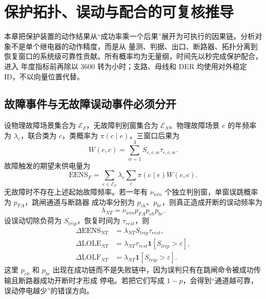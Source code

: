 \section{保护拓扑、误动与配合的可复核推导}\label{sec:rel-protection-topology-cases}

本章把保护装置的动作结果从“成功率乘一个后果”展开为可执行的因果链。分析对象不是单个继电器的动作精度，而是从
量测、判据、出口、断路器、拓扑分离到恢复窗口的系统级可靠性贡献。所有概率均为无量纲，时间先以秒完成保护配合，进入
年度指标前再除以 $3600$ 转为小时；支路、母线和 DER 均使用对外稳定 ID，不以向量位置代替。

\subsection{故障事件与无故障误动事件必须分开}
设物理故障场景集合为 $\mathcal E_F$，无故障判别窗集合为 $\mathcal E_N$。物理故障场景 $e$ 的年频率为
$\lambda_e$，联合类为 $c$，类概率为 $\pi(c\mid e)$，三窗口后果为
\begin{equation}
 W(e,c)=\sum_{w=1}^{3}S_{e,c,w}\tau_{e,c,w}.
\end{equation}
故障触发的期望未供电量为
\begin{equation}
 \mathrm{EENS}_{F}=\sum_{e\in\mathcal E_F}\lambda_e
 \sum_c\pi(c\mid e)W(e,c).
\end{equation}
无故障时不存在上述起始故障频率。若一年有 $\nu_{win}$ 个独立判别窗，单窗误跳概率为 $p_{FA}$，跳闸通道与断路器
成功率分别为 $p_{ch}$、$p_{br}$，则真正造成开断的误动频率为
\begin{equation}\label{eq:rel-misop-frequency}
 \lambda_{NT}=\nu_{win}p_{FA}p_{ch}p_{br}.
\end{equation}
设误动切除负荷为 $S_{trip}$，恢复时间为 $\tau_{rest}$，则
\begin{align}
 \Delta\mathrm{EENS}_{NT}&=\lambda_{NT}S_{trip}\tau_{rest},\\
 \Delta\mathrm{LOLE}_{NT}&=\lambda_{NT}\tau_{rest}
   \mathbf 1[S_{trip}>\varepsilon],\\
 \Delta\mathrm{LOLF}_{NT}&=\lambda_{NT}
   \mathbf 1[S_{trip}>\varepsilon].
\end{align}
这里 $p_{ch}$ 和 $p_{br}$ 出现在成功链而不是失败链中，因为误判只有在跳闸命令被成功传输且断路器成功开断时才形成
停电。若把它们写成 $1-p$，会得到“通道越可靠，误动停电越少”的错误方向。

